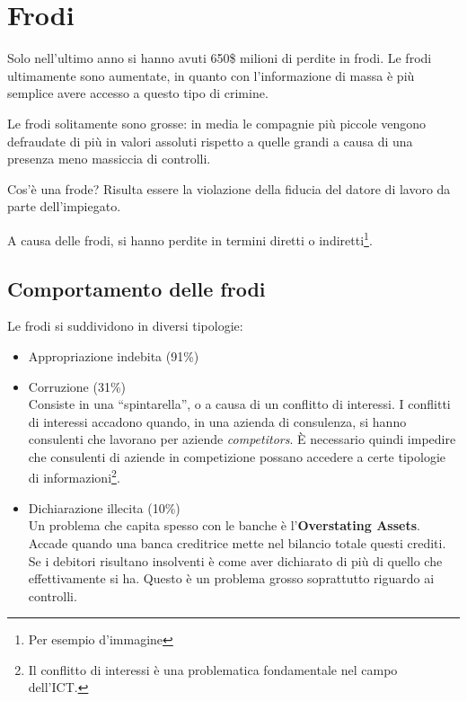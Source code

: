 \chapter{Frodi}
\label{Frodi}

Solo nell'ultimo anno si hanno avuti 650\$ milioni di perdite in frodi. Le frodi
ultimamente sono aumentate, in quanto con l'informazione di massa è più
semplice avere accesso a questo tipo di crimine.

Le frodi solitamente sono grosse: in media le compagnie più piccole vengono
defraudate di più in valori assoluti rispetto a quelle grandi a causa di una presenza
meno massiccia di controlli.

Cos'è una frode? Risulta essere la violazione della fiducia del
datore di lavoro da parte dell'impiegato.

A causa delle frodi, si hanno perdite in termini diretti o 
indiretti\footnote{Per esempio d'immagine}.

\section{Comportamento delle frodi}

Le frodi si suddividono in diversi tipologie:

\begin{itemize}
  \item Appropriazione indebita (91\%)
  \item Corruzione (31\%) \\
  Consiste in una ``spintarella'', o a causa di un conflitto di interessi. I
  conflitti di interessi accadono quando, in una azienda di consulenza, si
  hanno consulenti che lavorano per aziende \textit{competitors}. È necessario
  quindi impedire che consulenti di aziende in competizione possano accedere a
  certe tipologie di informazioni\footnote{Il conflitto di interessi è una
  problematica fondamentale nel campo dell'ICT.}.
  \item Dichiarazione illecita (10\%) \\
  Un problema che capita spesso con le banche è l'\textbf{Overstating Assets}.
  Accade quando una banca creditrice mette nel bilancio totale questi crediti.
  Se i debitori risultano insolventi è come aver dichiarato di più di quello
  che effettivamente si ha. Questo è un problema grosso soprattutto riguardo ai
  controlli.
\end{itemize}
